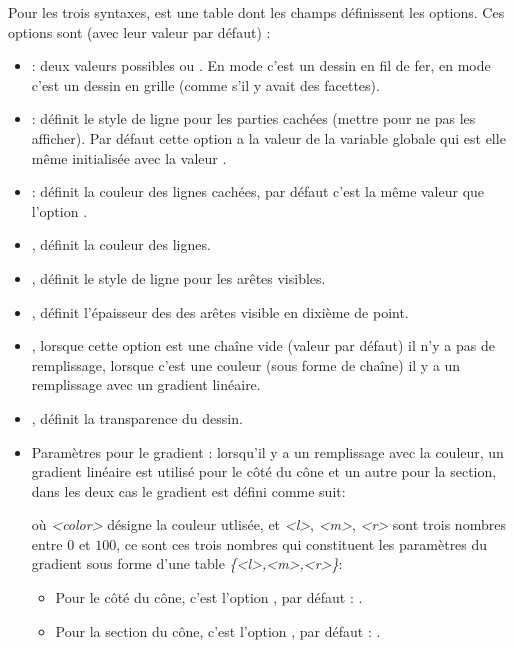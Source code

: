 Pour les trois syntaxes,  est une table dont les champs définissent les options. Ces options sont (avec leur valeur par défaut) :
\begin{itemize}
    \item {} : deux valeurs possibles  ou . En mode  c'est un dessin en fil de fer, en mode  c'est un dessin en grille (comme s'il y avait des facettes).
    
    \item {} : définit le style de ligne pour les parties cachées (mettre  pour ne pas les afficher). Par défaut cette option a la valeur de la variable globale  qui est elle même initialisée avec la valeur .
    
    \item {}: définit la couleur des lignes cachées, par défaut c'est la même valeur que l'option .
    
    \item {}, définit la couleur des lignes.
    
    \item {}, définit le style de ligne pour les arêtes visibles.

    \item {}, définit l'épaisseur des des arêtes visible en dixième de point.    
    
    \item {}, lorsque cette option est une chaîne vide (valeur par défaut) il n'y a pas de remplissage,  lorsque c'est une couleur (sous forme de chaîne) il y a un remplissage avec un gradient linéaire.
    
    \item {}, définit la transparence du dessin.
    
    \item Paramètres pour le gradient : lorsqu'il y a un remplissage avec la couleur, un gradient linéaire est utilisé pour le côté du cône et un autre pour la section, dans les deux cas le gradient est défini comme suit:\par
    où \emph{<color>} désigne la couleur utlisée, et \emph{<l>}, \emph{<m>}, \emph{<r>} sont trois nombres entre $0$ et $100$, ce sont ces trois nombres qui constituent les paramètres du gradient sous forme d'une table \emph{\{<l>,<m>,<r>\}}:
        \begin{itemize}
            \item Pour le côté du cône, c'est l'option , par défaut : .
            \item Pour la section du cône, c'est l'option , par défaut : .
        \end{itemize}
\end{itemize}

